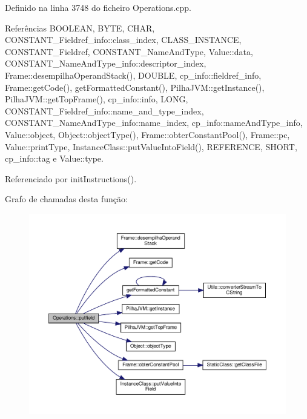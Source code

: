 Definido na linha 3748 do ficheiro Operations.\+cpp.



Referências B\+O\+O\+L\+E\+AN, B\+Y\+TE, C\+H\+AR, C\+O\+N\+S\+T\+A\+N\+T\+\_\+\+Fieldref\+\_\+info\+::class\+\_\+index, C\+L\+A\+S\+S\+\_\+\+I\+N\+S\+T\+A\+N\+CE, C\+O\+N\+S\+T\+A\+N\+T\+\_\+\+Fieldref, C\+O\+N\+S\+T\+A\+N\+T\+\_\+\+Name\+And\+Type, Value\+::data, C\+O\+N\+S\+T\+A\+N\+T\+\_\+\+Name\+And\+Type\+\_\+info\+::descriptor\+\_\+index, Frame\+::desempilha\+Operand\+Stack(), D\+O\+U\+B\+LE, cp\+\_\+info\+::fieldref\+\_\+info, Frame\+::get\+Code(), get\+Formatted\+Constant(), Pilha\+J\+V\+M\+::get\+Instance(), Pilha\+J\+V\+M\+::get\+Top\+Frame(), cp\+\_\+info\+::info, L\+O\+NG, C\+O\+N\+S\+T\+A\+N\+T\+\_\+\+Fieldref\+\_\+info\+::name\+\_\+and\+\_\+type\+\_\+index, C\+O\+N\+S\+T\+A\+N\+T\+\_\+\+Name\+And\+Type\+\_\+info\+::name\+\_\+index, cp\+\_\+info\+::name\+And\+Type\+\_\+info, Value\+::object, Object\+::object\+Type(), Frame\+::obter\+Constant\+Pool(), Frame\+::pc, Value\+::print\+Type, Instance\+Class\+::put\+Value\+Into\+Field(), R\+E\+F\+E\+R\+E\+N\+CE, S\+H\+O\+RT, cp\+\_\+info\+::tag e Value\+::type.



Referenciado por init\+Instructions().

Grafo de chamadas desta função\+:
\nopagebreak
\begin{figure}[H]
\begin{center}
\leavevmode
\includegraphics[width=350pt]{classOperations_a56385f246d3d4d5c5674c988a1f0e658_cgraph}
\end{center}
\end{figure}
\mbox{\label{classOperations_ac6791ccfd8adf30d8f80b1f679f0b146}} 
